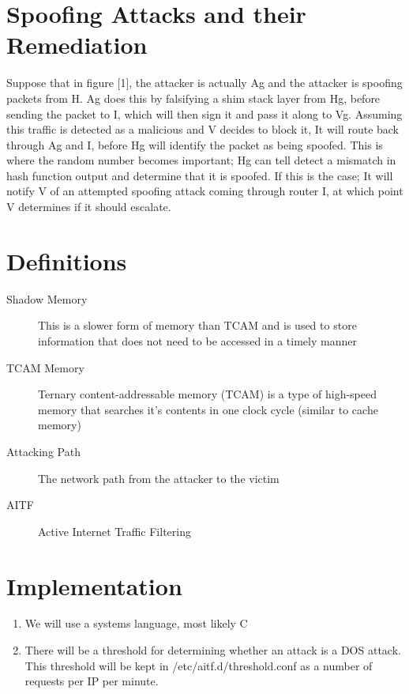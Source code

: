 \documentclass[11pt]{article}
\begin{document}
\section{Spoofing Attacks and their Remediation}
Suppose that in figure [1], the attacker is actually Ag and the attacker is spoofing packets from H. Ag does this by falsifying a shim stack layer from Hg, before sending the packet to I, which will then sign it and pass it along to Vg. Assuming this traffic is detected as a malicious and V decides to block it, It will route back through Ag and I, before Hg will identify the packet as being spoofed. This is where the random number becomes important; Hg can tell detect a mismatch in hash function output and determine that it is spoofed. If this is the case; It will notify V of an attempted spoofing attack coming through router I, at which point V determines if it should escalate.

\section{Definitions}
\begin{description}
	\item[Shadow Memory] This is a slower form of memory than TCAM and is used to store information that does not need to be accessed in a timely manner
	\item[TCAM Memory] Ternary content-addressable memory (TCAM) is a type of high-speed memory that searches it’s contents in one clock cycle (similar to cache memory)
	\item[Attacking Path] The network path from the attacker to the victim
	\item[AITF] Active Internet Traffic Filtering
\end{description}

\section{Implementation}
\begin{enumerate}
	\item We will use a systems language, most likely C
	\item There will be a threshold for determining whether an attack is a DOS attack. This threshold will be kept in /etc/aitf.d/threshold.conf as a number of requests per IP per minute.
\end{enumerate}
\end{document}
